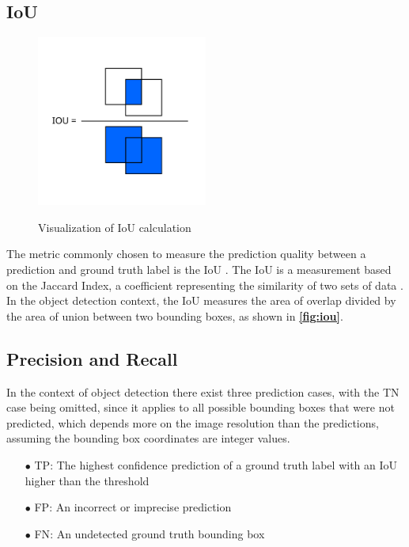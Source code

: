 \documentclass[10pt]{book}
\newcommand{\figureref}[1]{\textbf{\autoref{#1}}}
\begin{document}
\subsection{IoU}

\begin{figure}
  \caption{Visualization of \ac{IoU} calculation}
  \includegraphics[width=0.5\textwidth]{image/iou}
  \label{fig:iou}
\end{figure}

The metric commonly chosen to measure the prediction quality between a prediction and ground truth label is the \ac{IoU} \cite{padilla2020survey}. The \ac{IoU} is a measurement based on the Jaccard Index, a coefficient representing the similarity of two sets of data \cite{jaccard1901etude}. In the object detection context, the \ac{IoU} measures the area of overlap divided by the area of union between two bounding boxes, as shown in \figureref{fig:iou}.

\subsection{Precision and Recall}

In the context of object detection there exist three prediction cases, with the \ac{TN} case being omitted, since it applies to all possible bounding boxes that were not predicted, which depends more on the image resolution than the predictions, assuming the bounding box coordinates are integer values.

\begin{itemize}
  \item[$\bullet$] \ac{TP}: The highest confidence prediction of a ground truth label with an \ac{IoU} higher than the threshold
  \item[$\bullet$] \ac{FP}: An incorrect or imprecise prediction
  \item[$\bullet$] \ac{FN}: An undetected ground truth bounding box
\end{itemize}
\end{document}

